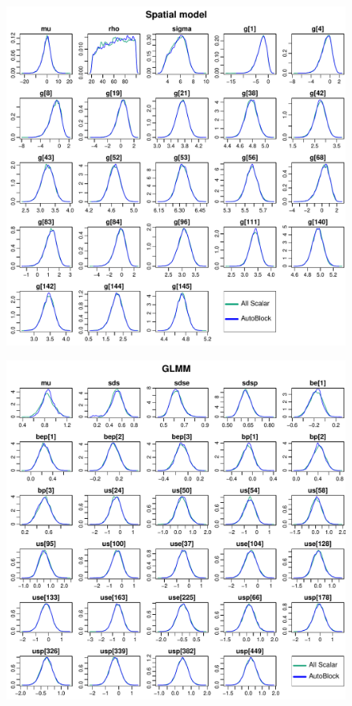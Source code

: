 \documentclass{article}
\begin{document}
\begin{figure}[h]
\centerline{\includegraphics[scale=1.0]{Spatialmodel}}
\end{figure}
\thispagestyle{empty}
\clearpage

\begin{figure}[h]
\centerline{\includegraphics[scale=1.0]{GLMM}}
\end{figure}
\thispagestyle{empty}
\clearpage
\end{document}

